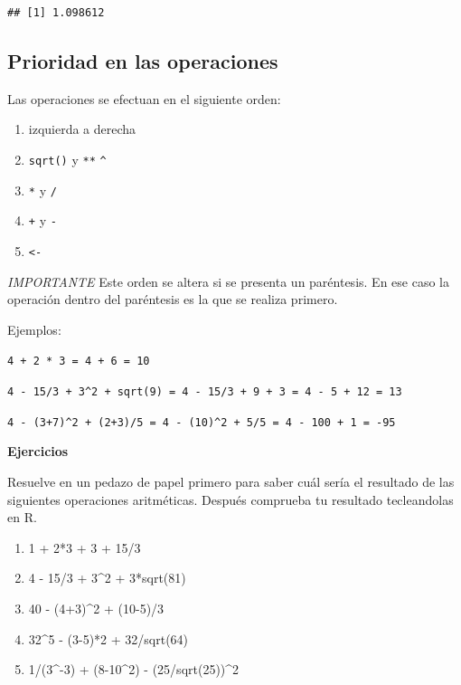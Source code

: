 \documentclass[
]{book}
\providecommand{\tightlist}{%
  \setlength{\itemsep}{0pt}\setlength{\parskip}{0pt}}
\begin{document}
\begin{verbatim}
## [1] 1.098612
\end{verbatim}

\hypertarget{prioridad-en-las-operaciones}{%
\subsection{Prioridad en las operaciones}\label{prioridad-en-las-operaciones}}

Las operaciones se efectuan en el siguiente orden:

\begin{enumerate}
\def\labelenumi{\arabic{enumi}.}
\tightlist
\item
  izquierda a derecha
\item
  \texttt{sqrt()} y \texttt{**} \texttt{\^{}}
\item
  \texttt{*} y \texttt{/}
\item
  \texttt{+} y \texttt{-}
\item
  \texttt{\textless{}-}
\end{enumerate}

\emph{IMPORTANTE} Este orden se altera si se presenta un paréntesis. En ese caso la operación dentro del paréntesis es la que se realiza primero.

Ejemplos:

\texttt{4\ +\ 2\ *\ 3\ =\ 4\ +\ 6\ =\ 10}

\texttt{4\ -\ 15/3\ +\ 3\^{}2\ +\ sqrt(9)\ =\ 4\ -\ 15/3\ +\ 9\ +\ 3\ =\ 4\ -\ 5\ +\ 12\ =\ 13}

\texttt{4\ -\ (3+7)\^{}2\ +\ (2+3)/5\ =\ 4\ -\ (10)\^{}2\ +\ 5/5\ =\ 4\ -\ 100\ +\ 1\ =\ -95}

\textbf{Ejercicios}

Resuelve en un pedazo de papel primero para saber cuál sería el resultado de las siguientes operaciones aritméticas. Después comprueba tu resultado tecleandolas en R.

\begin{enumerate}
\def\labelenumi{\arabic{enumi}.}
\tightlist
\item
  1 + 2*3 + 3 + 15/3
\item
  4 - 15/3 + 3\^{}2 + 3*sqrt(81)
\item
  40 - (4+3)\^{}2 + (10-5)/3
\item
  32\^{}5 - (3-5)*2 + 32/sqrt(64)
\item
  1/(3\^{}-3) + (8-10\^{}2) - (25/sqrt(25))\^{}2
\end{enumerate}
\end{document}
